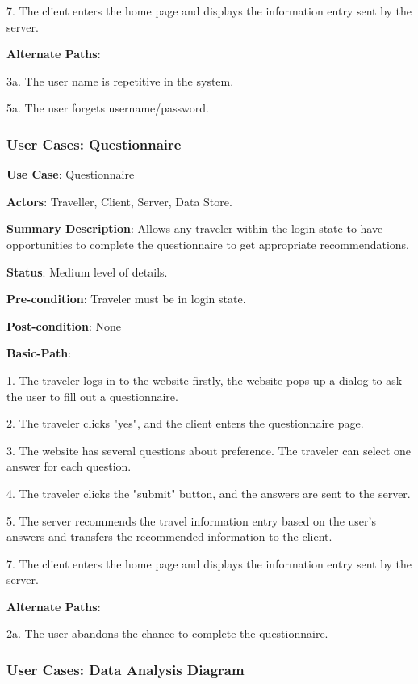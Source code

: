 \documentclass[conference]{IEEEtran}
\begin{document}
7. The client enters the home page and displays the information entry sent by the server.

\textbf{Alternate Paths}:

3a. The user name is repetitive in the system.

5a. The user forgets username/password.


\subsubsection{User Cases: Questionnaire}

\textbf{ }

\textbf{Use Case}: Questionnaire

\textbf{Actors}: Traveller, Client, Server, Data Store.

\textbf{Summary Description}: Allows any traveler within the login state to have opportunities to complete the questionnaire to get appropriate recommendations.
 
\textbf{Status}: Medium level of details.

\textbf{Pre-condition}: Traveler must be in login state.

\textbf{Post-condition}: None

\textbf{Basic-Path}:

1. The traveler logs in to the website firstly, the website pops up a dialog to ask the user to fill out a questionnaire.

2. The traveler clicks "yes", and the client enters the questionnaire page.

3. The website has several questions about preference. The traveler can select one answer for each question.

4. The traveler clicks the "submit" button, and the answers are sent to the server.

5. The server recommends the travel information entry based on the user's answers and transfers the recommended information to the client.

7. The client enters the home page and displays the information entry sent by the server.

\textbf{Alternate Paths}:

2a. The user abandons the chance to complete the questionnaire.




\subsubsection{User Cases: Data Analysis Diagram}
\end{document}
